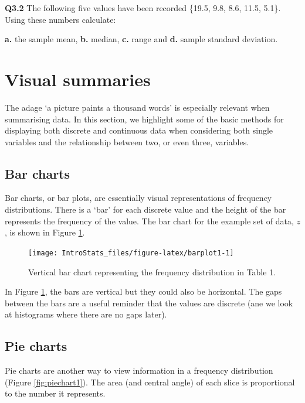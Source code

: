 \documentclass[
  oneside]{krantz}
\begin{document}
\textbf{Q3.2} The following five values have been recorded \{19.5, 9.8, 8.6, 11.5, 5.1\}. Using these numbers calculate:

\textbf{a.} the sample mean,
\textbf{b.} median,
\textbf{c.} range and
\textbf{d.} sample standard deviation.

\hypertarget{visual-summaries}{%
\section{Visual summaries}\label{visual-summaries}}

The adage `a picture paints a thousand words' is especially relevant when summarising data. In this section, we highlight some of the basic methods for displaying both discrete and continuous data when considering both single variables and the relationship between two, or even three, variables.

\hypertarget{bar-charts}{%
\subsection{Bar charts}\label{bar-charts}}

Bar charts, or bar plots, are essentially visual representations of frequency distributions. There is a `bar' for each discrete value and the height of the bar represents the frequency of the value. The bar chart for the example set of data, \(z\), is shown in Figure \ref{fig:barplot1}.

\begin{figure}

{\centering \texttt{[image: IntroStats\_files/figure-latex/barplot1-1]} 

}

\caption{Vertical bar chart representing the frequency distribution in Table 1.}\label{fig:barplot1}
\end{figure}

In Figure \ref{fig:barplot1}, the bars are vertical but they could also be horizontal. The gaps between the bars are a useful reminder that the values are discrete (ane we look at histograms where there are no gaps later).

\hypertarget{pie-charts}{%
\subsection{Pie charts}\label{pie-charts}}

Pie charts are another way to view information in a frequency distribution (Figure \ref{fig:piechart1}). The area (and central angle) of each slice is proportional to the number it represents.
\end{document}

